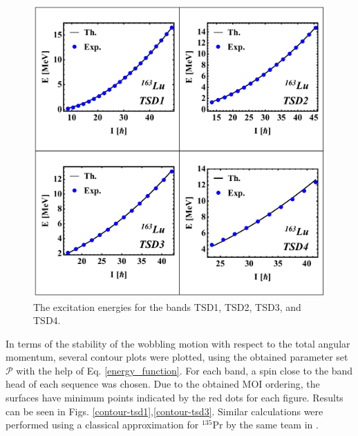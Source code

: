 \documentclass[%
 reprint,
 amsmath,
 amssymb,
 aps,
 floatfix,
]{revtex4-2}
\begin{document}
\begin{figure}
    \centering
    \includegraphics[scale=0.40]{images/ExcitationEnergies_GridView.pdf}
    \caption{The excitation energies for the bands TSD1, TSD2, TSD3, and TSD4.}
    \label{tsd_bands}
\end{figure}

In terms of the stability of the wobbling motion with respect to the total angular momentum, several contour plots were plotted, using the obtained parameter set $\mathcal{P}$ with the help of Eq. \ref{energy_function}. For each band, a spin close to the band head of each sequence was chosen. Due to the obtained MOI ordering, the surfaces have minimum points indicated by the red dots for each figure. Results can be seen in Figs. \ref{contour-tsd1},\ref{contour-tsd3}. Similar calculations were performed using a classical approximation for $^{135}$Pr by the same team in \cite{raduta2021}.
\end{document}
